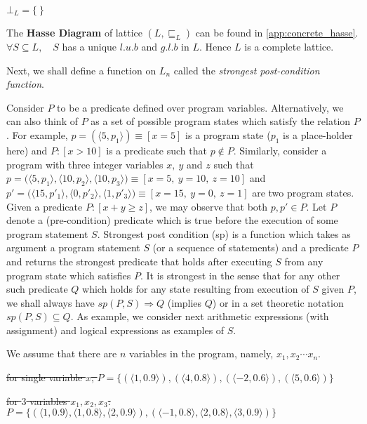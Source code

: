 \documentclass[final,3p, review, times]{util/elsarticle}
\begin{document}
$\bot_L=\big\{\ \big\}$

The \textbf{Hasse Diagram} of lattice $(L,\sqsubseteq_L)$ can be found in \ref{app:concrete_hasse}. $\forall S\subseteq L,\quad S$ has a unique $l.u.b$ and $g.l.b$ in $L$. Hence $L$ is a complete lattice.

Next, we shall define a function on $L_n$ called the \textit{strongest post-condition function}\cite{lara13}.

Consider $P$ to be a predicate defined over program variables. Alternatively, we can also think of $P$ as a set of possible program states which satisfy the relation $P$. For example, $p=(\langle5,p_1\rangle)\equiv[x=5]$ is a program state ($p_1$ is a place-holder here) and $P:[x>10]$ is a predicate such that $p\notin P$. Similarly, consider a program with three integer variables $x,\ y$ and $z$ such that $p=\big(\langle5,p_1\rangle,\langle10,p_2\rangle,\langle10,p_3\rangle\big)\equiv[x=5,\ y=10,\ z=10]$ and $p'=\big(\langle15,p'_1\rangle,\langle0,p'_2\rangle,\langle1,p'_3\rangle\big)\equiv[x=15,\ y=0,\ z=1]$ are two program states. Given a predicate $P:[x+y\geq z]$, we may observe that both $p,p'\in P$. Let $P$ denote a (pre-condition) predicate which is true before the execution of some program statement $S$. Strongest post condition (sp) is a function which takes as argument a program statement $S$ (or a sequence of statements) and a predicate $P$ and returns the strongest predicate that holds after executing $S$ from any program state which satisfies $P$. It is strongest in the sense that for any other such predicate $Q$ which holds for any state resulting from execution of $S$ given $P$, we shall always have $sp(P,S)\Rightarrow Q$ (implies $Q$) or in a set theoretic notation $sp(P,S)\subseteq Q$. As example, we consider next arithmetic expressions (with assignment) and logical expressions as examples of $S$.

We assume that there are $n$ variables in the program, namely, $x_1,x_2\cdots x_n$.

\st{for single variable $x$, $P=\{(\langle1,0.9\rangle),(\langle4,0.8\rangle),(\langle-2,0.6\rangle),(\langle5,0.6\rangle)\}$}

\st{for $3$ variables $x_1,x_2,x_3$: $P=\{(\langle1,0.9\rangle,\langle1,0.8\rangle,\langle2,0.9\rangle),(\langle-1,0.8\rangle,\langle2,0.8\rangle,\langle3,0.9\rangle)\}$}
\end{document}
